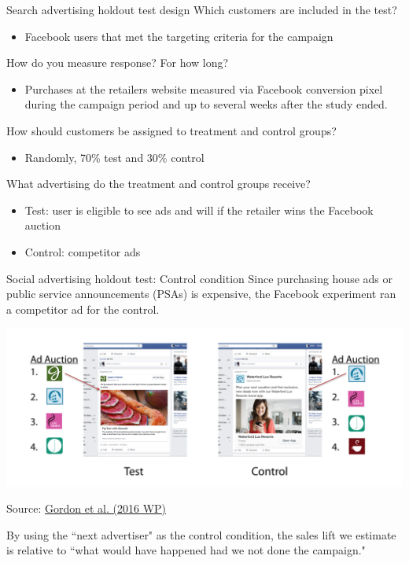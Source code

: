\documentclass[10pt, aspectratio=169]{beamer}
\newcommand{\source}[1]{\begin{flushright} \footnotesize Source: {#1} \end{flushright} \normalsize}
\begin{document}
\begin{frame}{Search advertising holdout test design}
Which customers are included in the test?\\
\begin{itemize}
\item Facebook users that met the targeting criteria for the campaign
\end{itemize}
\pause 
How do you measure response? For how long?
\begin{itemize}
\item Purchases at the retailers website measured via Facebook conversion pixel during the campaign period and up to several weeks after the study ended.
\end{itemize}
\pause
How should customers be assigned to treatment and control groups? \\
\begin{itemize}
\item Randomly, 70\% test and 30\% control
\end{itemize}
\pause
What advertising do the treatment and control groups receive?\\
\begin{itemize}
\item Test: user is eligible to see ads and will if the retailer wins the Facebook auction
\item Control: competitor ads
\end{itemize}
\end{frame}

\begin{frame}{Social advertising holdout test: Control condition}
Since purchasing house ads or public service announcements (PSAs) is expensive, the Facebook experiment ran a competitor ad for the control. \\
\begin{center}
\includegraphics[height=0.5\textheight]{images/gordonetaltreatmentcontrol2.png}\\
\end{center}
\source{\href{https://drive.google.com/uc?export=download&id=0B0EzanlzLNsWU1BkWnFxZlZuZUE}{Gordon et al. (2016 WP)}}
\alert{By using the ``next advertiser" as the control condition, the sales lift we estimate is relative to ``what would have happened had we not done the campaign."}
\end{frame}
\end{document}
